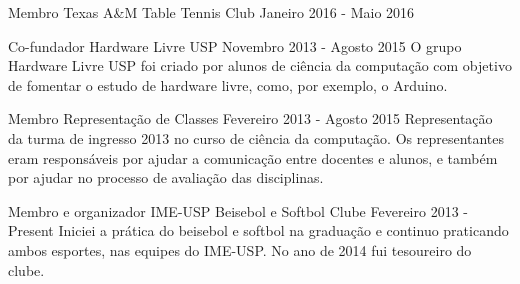 \documentclass[11pt, a4paper]{awesome-cv-res}
\begin{document}
\begin{cventries}
\cventry
    {Membro\vspace{-3em}}
    {\vspace{-3em}Texas A\&M Table Tennis Club}
{}
{Janeiro 2016 - Maio 2016}
{}

\cventry
{Co-fundador}
{Hardware Livre USP}
{}
{Novembro 2013 - Agosto 2015}
{O grupo Hardware Livre USP foi criado por alunos de ciência da 
    computação com objetivo de fomentar o estudo de hardware livre,
    como, por exemplo, o Arduino.
}

\cventry
{Membro}
{Representação de Classes}
{}
{Fevereiro 2013 - Agosto 2015}
{Representação da turma de ingresso 2013 no curso de ciência da 
    computação. Os representantes eram responsáveis por ajudar a 
    comunicação entre docentes e alunos, e também por ajudar no
    processo de avaliação das disciplinas.}

\cventry
{Membro e organizador}
{IME-USP Beisebol e Softbol Clube}
{}
{Fevereiro 2013 - Present}
{Iniciei a prática do beisebol e softbol na graduação e continuo
praticando ambos esportes, nas equipes do IME-USP. No ano de 2014
fui tesoureiro do clube.}

\end{cventries}
\end{document}
